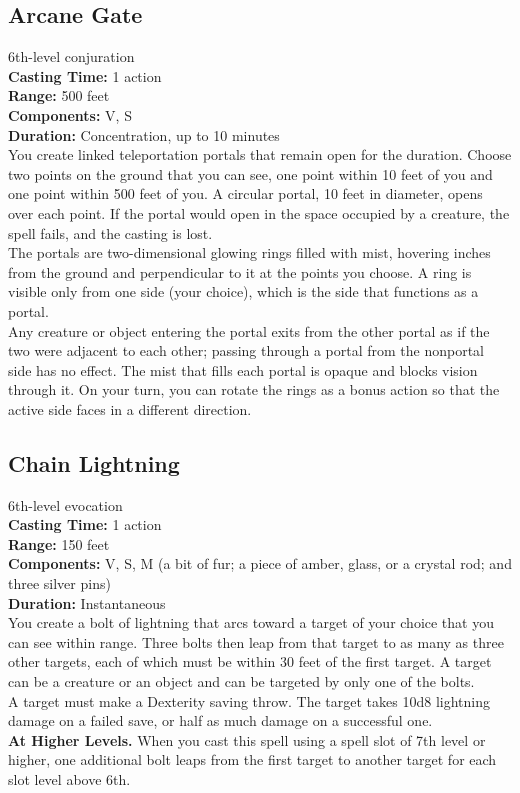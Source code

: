 \documentclass[11pt, A4paper, english]{article}
\begin{document}
		\subsection{Arcane Gate}
6th-level conjuration \\
\textbf{Casting Time:} 1 action \\
\textbf{Range:} 500 feet \\
\textbf{Components:} V, S \\
\textbf{Duration:} Concentration, up to 10 minutes \\
You create linked teleportation portals that remain open for the duration. Choose two points on the ground that you can see, one point within 10 feet of you and one point within 500 feet of you. A circular portal, 10 feet in diameter, opens over each point. If the portal would open in the space occupied by a creature, the spell fails, and the casting is lost. \\
The portals are two-dimensional glowing rings filled with mist, hovering inches from the ground and perpendicular to it at the points you choose. A ring is visible only from one side (your choice), which is the side that functions as a portal. \\
Any creature or object entering the portal exits from the other portal as if the two were adjacent to each other; passing through a portal from the nonportal side has no effect. The mist that fills each portal is opaque and blocks vision through it. On your turn, you can rotate the rings as a bonus action so that the active side faces in a different direction.

		\subsection{Chain Lightning}
6th-level evocation \\
\textbf{Casting Time:} 1 action \\
\textbf{Range:} 150 feet \\
\textbf{Components:} V, S, M (a bit of fur; a piece of amber, glass, or a crystal rod; and three silver pins) \\
\textbf{Duration:} Instantaneous \\
You create a bolt of lightning that arcs toward a target of your choice that you can see within range. Three bolts then leap from that target to as many as three other targets, each of which must be within 30 feet of the first target. A target can be a creature or an object and can be targeted by only one of the bolts. \\
A target must make a Dexterity saving throw. The target takes 10d8 lightning damage on a failed save, or half as much damage on a successful one. \\
\textbf{At Higher Levels.} When you cast this spell using a spell slot of 7th level or higher, one additional bolt leaps from the first target to another target for each slot level above 6th.
\end{document}
